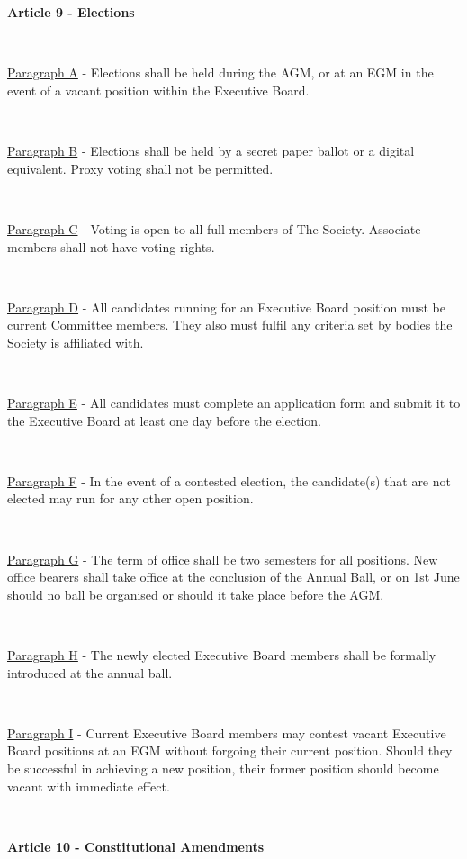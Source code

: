 ~

~

\newpage

\large{\textbf{Article 9 - Elections}}

~

\underline{Paragraph A} - Elections shall be held during the AGM, or at an EGM in
the event of a vacant position within the Executive Board.

~

\underline{Paragraph B} - Elections shall be held by a secret paper ballot or a digital equivalent. 
Proxy voting shall not be permitted.

~

\underline{Paragraph C} - Voting is open to all full members of The
Society. Associate members shall not have voting rights.

~

\underline{Paragraph D} - All candidates running for an Executive Board position
must be current Committee members. They also must fulfil any criteria set by bodies the Society is affiliated with.

~

\underline{Paragraph E} - All candidates must complete an application
form and submit it to the Executive Board at least one day before the
election.

~

\underline{Paragraph F} - In the event of a contested election, the
candidate(s) that are not elected may run for any other open position.

~

\underline{Paragraph G} - The term of office shall be two semesters for
all positions. New office bearers shall take office at the conclusion of the Annual Ball,
or on 1st June should no ball be organised or should it take place before the AGM.


~

\underline{Paragraph H} - The newly elected Executive Board members
shall be formally introduced at the annual ball.

~

\underline{Paragraph I} - Current Executive Board members may contest vacant Executive Board positions at an EGM
without forgoing their current position. Should they be successful in achieving a new position, their former position
should become vacant with immediate effect.

~

\newpage

\large{\textbf{Article 10 - Constitutional Amendments}}

